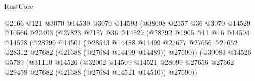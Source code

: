 \begin{lexlean}{RustCore}
\begin{coremodule}
                                      @2166
                                      @121
                                      @3070
                                      @14530
                                      @3070
                                      @14593
                                      (@38008
                                        @2157
                                        @36
                                        @3070
                                        @14529
                                        @10566
                                        @22403
                                        (@27823
                                          @2157
                                          @36
                                          @14529
                                          (@28292
                                            @1905
                                            @11
                                            @16
                                            @14504
                                            @14528
                                            (@28299
                                              @14504
                                              (@28543
                                                @14488
                                                @14499
                                                @27627
                                                @27656
                                                @27662
                                                @28312
                                                @27682
                                                (@21388 (@27684 @14499 @14489))
                                                @27690))
                                            (@39083
                                              @14526
                                              @5789
                                              (@31110
                                                @14526
                                                (@32002
                                                  @14509
                                                  @14521
                                                  @28099
                                                  @27656
                                                  @27662
                                                  @29458
                                                  @27682
                                                  (@21388 (@27684 @14521 @14510))
                                                  @27690))

\end{coremodule}
\end{lexlean}
